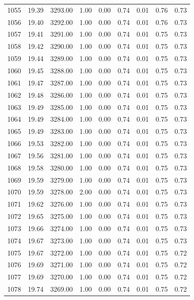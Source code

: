 \documentclass{article}\usepackage[]{graphicx}\usepackage[]{color}
\begin{document}
\begin{longtable}{rrrrrrrrr}
  1055 & 19.39 & 3293.00 & 1.00 & 0.00 & 0.74 & 0.01 & 0.76 & 0.73 \\ 
  1056 & 19.40 & 3292.00 & 1.00 & 0.00 & 0.74 & 0.01 & 0.76 & 0.73 \\ 
  1057 & 19.41 & 3291.00 & 1.00 & 0.00 & 0.74 & 0.01 & 0.75 & 0.73 \\ 
  1058 & 19.42 & 3290.00 & 1.00 & 0.00 & 0.74 & 0.01 & 0.75 & 0.73 \\ 
  1059 & 19.44 & 3289.00 & 1.00 & 0.00 & 0.74 & 0.01 & 0.75 & 0.73 \\ 
  1060 & 19.45 & 3288.00 & 1.00 & 0.00 & 0.74 & 0.01 & 0.75 & 0.73 \\ 
  1061 & 19.47 & 3287.00 & 1.00 & 0.00 & 0.74 & 0.01 & 0.75 & 0.73 \\ 
  1062 & 19.48 & 3286.00 & 1.00 & 0.00 & 0.74 & 0.01 & 0.75 & 0.73 \\ 
  1063 & 19.49 & 3285.00 & 1.00 & 0.00 & 0.74 & 0.01 & 0.75 & 0.73 \\ 
  1064 & 19.49 & 3284.00 & 1.00 & 0.00 & 0.74 & 0.01 & 0.75 & 0.73 \\ 
  1065 & 19.49 & 3283.00 & 1.00 & 0.00 & 0.74 & 0.01 & 0.75 & 0.73 \\ 
  1066 & 19.53 & 3282.00 & 1.00 & 0.00 & 0.74 & 0.01 & 0.75 & 0.73 \\ 
  1067 & 19.56 & 3281.00 & 1.00 & 0.00 & 0.74 & 0.01 & 0.75 & 0.73 \\ 
  1068 & 19.58 & 3280.00 & 1.00 & 0.00 & 0.74 & 0.01 & 0.75 & 0.73 \\ 
  1069 & 19.59 & 3279.00 & 1.00 & 0.00 & 0.74 & 0.01 & 0.75 & 0.73 \\ 
  1070 & 19.59 & 3278.00 & 2.00 & 0.00 & 0.74 & 0.01 & 0.75 & 0.73 \\ 
  1071 & 19.62 & 3276.00 & 1.00 & 0.00 & 0.74 & 0.01 & 0.75 & 0.73 \\ 
  1072 & 19.65 & 3275.00 & 1.00 & 0.00 & 0.74 & 0.01 & 0.75 & 0.73 \\ 
  1073 & 19.66 & 3274.00 & 1.00 & 0.00 & 0.74 & 0.01 & 0.75 & 0.73 \\ 
  1074 & 19.67 & 3273.00 & 1.00 & 0.00 & 0.74 & 0.01 & 0.75 & 0.73 \\ 
  1075 & 19.67 & 3272.00 & 1.00 & 0.00 & 0.74 & 0.01 & 0.75 & 0.72 \\ 
  1076 & 19.69 & 3271.00 & 1.00 & 0.00 & 0.74 & 0.01 & 0.75 & 0.72 \\ 
  1077 & 19.69 & 3270.00 & 1.00 & 0.00 & 0.74 & 0.01 & 0.75 & 0.72 \\ 
  1078 & 19.74 & 3269.00 & 1.00 & 0.00 & 0.74 & 0.01 & 0.75 & 0.72 \\ 

\end{longtable}
\end{document}
